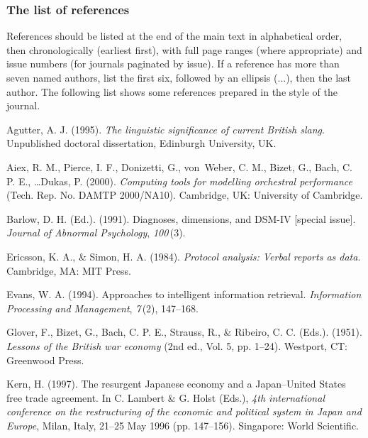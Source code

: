 \documentclass{tATO2e}
\begin{document}
\subsubsection{The list of references}

References should be listed at the end of the main text in alphabetical order, then chronologically (earliest first), with full page ranges (where appropriate) and issue numbers (for journals paginated by issue). If a reference has more than seven named authors, list the first six, followed by an ellipsis (...), then the last author. The following list shows some references prepared in the style of the journal.
%
\begin{thebibliography}{12}

Agutter, A. J. (1995). {\em{The linguistic significance of current
 British slang}}. Unpublished doctoral dissertation, Edinburgh
 University, UK.

Aiex, R. M., Pierce, I. F., Donizetti, G., {{v}on~Weber}, C. M., Bizet, G.,
 Bach, C. P. E., \ldots Dukas, P. (2000). {\em{Computing tools for
 modelling orchestral performance}} (Tech. Rep. No. DAMTP 2000/NA10).
 Cambridge, UK: University of Cambridge.

Barlow, D. H. (Ed.). (1991). Diagnoses, dimensions, and DSM-IV [special
 issue]. {\em{Journal of Abnormal Psychology}}, {\em{100}\,}(3).

Ericsson, K. A., \& Simon, H. A. (1984). {\em{Protocol analysis:
 Verbal reports as data}}. Cambridge, MA: MIT Press.

Evans, W. A. (1994). Approaches to intelligent information retrieval.
 {\em{Information Processing and Management}}, {\em{7\,}}(2), 147--168.

Glover, F., Bizet, G., Bach, C. P. E., Strauss, R., \& Ribeiro, C. C. (Eds.).
 (1951). {\em{Lessons of the British war economy}} (2nd ed., Vol. 5, pp. 1--24).
 Westport, CT: Greenwood Press.

Kern, H. (1997). The resurgent Japanese economy and a Japan--United
 States free trade agreement. In C. Lambert \& G. Holst (Eds.), {\em{4th
 international conference on the restructuring of the economic and
 political system in Japan and Europe}}, Milan, Italy, 21--25 May 1996 (pp.
 147--156). Singapore: World Scientific.


\end{thebibliography}
\end{document}
